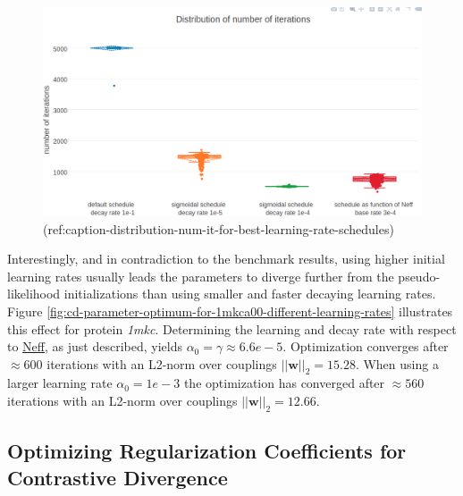 \documentclass[12pt,a4paper,twoside]{book}
\newcommand{\w}{\mathbf{w}}
\theoremstyle{definition}
\theoremstyle{definition}
\theoremstyle{remark}
\begin{document}
\begin{figure}

{\centering \includegraphics[width=0.9\linewidth]{img/full_likelihood/distribution_numiterations_against_different_learning_rate_schedules} 

}

\caption{(ref:caption-distribution-num-it-for-best-learning-rate-schedules)}\label{fig:distribution-num-it-for-best-learning-rate-schedules}
\end{figure}

Interestingly, and in contradiction to the benchmark results, using
higher initial learning rates usually leads the parameters to diverge
further from the pseudo-likelihood initializations than using smaller
and faster decaying learning rates. Figure
\ref{fig:cd-parameter-optimum-for-1mkca00-different-learning-rates}
illustrates this effect for protein \emph{1mkc}. Determining the
learning and decay rate with respect to
\protect\hyperlink{abbrev}{Neff}, as just described, yields
\(\alpha_0 = \gamma \approx 6.6e-5\). Optimization converges after
\(\approx 600\) iterations with an L2-norm over couplings
\(||\w||_2 = 15.28\). When using a larger learning rate
\(\alpha_0 = 1e-3\) the optimization has converged after \(\approx 560\)
iterations with an L2-norm over couplings \(||\w||_2 = 12.66\).

\subsection{Optimizing Regularization Coefficients for Contrastive
Divergence}\label{optimizing-regularization-coefficients-for-contrastive-divergence}
\end{document}
